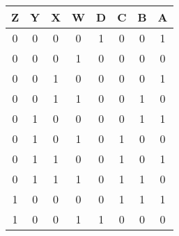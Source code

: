 \begin{tabular}{|c|c|c|c||c|c|c|c|}
\hline
Z & Y & X & W & D & C & B & A\\
\hline
0 & 0 & 0 & 0 & 1 & 0 & 0 & 1\\
0 & 0 & 0 & 1 & 0 & 0 & 0 & 0\\
0 & 0 & 1 & 0 & 0 & 0 & 0 & 1\\
0 & 0 & 1 & 1 & 0 & 0 & 1 & 0\\
0 & 1 & 0 & 0 & 0 & 0 & 1 & 1\\
0 & 1 & 0 & 1 & 0 & 1 & 0 & 0\\
0 & 1 & 1 & 0 & 0 & 1 & 0 & 1\\
0 & 1 & 1 & 1 & 0 & 1 & 1 & 0\\
1 & 0 & 0 & 0 & 0 & 1 & 1 & 1\\
1 & 0 & 0 & 1 & 1 & 0 & 0 & 0\\
\hline
\end{tabular}
